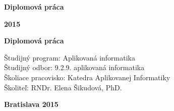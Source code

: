 \begin{center}
\centerline{\Large\sc\textbf\skola}
\sc\Large\textbf\fakulta
\end{center}

\vspace*{8cm}

\begin{center}
\begin{minipage}{0.8\textwidth}
\begin{center}
 \LARGE\sc\textbf\nazov
 \vspace{1em}
 \centerline{\Large\bf Diplomová práca}
\end{center}
\end{minipage}
\end{center}

\vfill
\noindent
 {\bf 2015}  \hfill {\bf \autor}
\thispagestyle{empty}



\newpage
\begin{center}
\centerline{\Large\sc\textbf\skola}
\sc\Large\textbf\fakulta
\end{center}

\vspace*{8cm}

\begin{center}
\begin{minipage}{0.8\textwidth}
\begin{center}
 \LARGE\sc\textbf\nazov
\end{center}
\vspace{1em}
\centerline{\Large\bf Diplomová práca}
\end{minipage}
\end{center}

\vspace{5cm}

\linespread{1.3}%
\selectfont

\noindent
Študijný program: \hspace{0.8em} Aplikovaná informatika\\
Študijný odbor:  \hspace{1.85em} 9.2.9. aplikovaná informatika\\
Školiace pracovisko: Katedra Aplikovanej Informatiky\\
Školiteľ:  \hspace{4.6em} RNDr. Elena Šikudová, PhD.


\vfill
\noindent
{\bf Bratislava 2015}  \hfill {\bf \autor}
\thispagestyle{empty}

